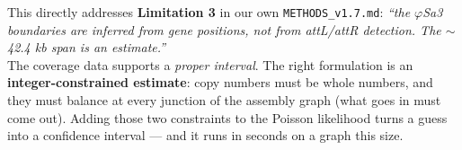 \begin{dobox}[title={Action: report copy number with an interval, not a point}]
This directly addresses \textbf{Limitation 3} in our own \texttt{METHODS\_v1.7.md}: \emph{``the
$\varphi$Sa3 boundaries are inferred from gene positions, not from attL/attR detection. The
$\sim$42.4 kb span is an estimate.''}\\[5pt]
The coverage data supports a \emph{proper interval}. The right formulation is an
\textbf{integer-constrained estimate}: copy numbers must be whole numbers, and they must balance at
every junction of the assembly graph (what goes in must come out). Adding those two constraints to
the Poisson likelihood turns a guess into a confidence interval --- and it runs in seconds on a
graph this size.
\end{dobox}
